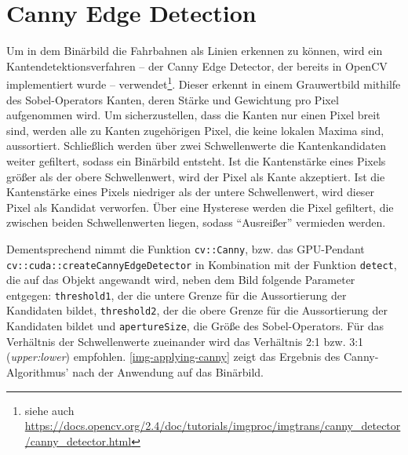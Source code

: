 \documentclass[a4paper,12pt]{report}
\begin{document}
\section{Canny Edge Detection}
	Um in dem Binärbild die Fahrbahnen als Linien erkennen zu können, wird ein Kantendetektionsverfahren -- der Canny Edge Detector, der bereits in OpenCV implementiert wurde -- verwendet\footnote{siehe auch \url{https://docs.opencv.org/2.4/doc/tutorials/imgproc/imgtrans/canny\_detector/canny\_detector.html}}.
	Dieser erkennt in einem Grauwertbild mithilfe des Sobel-Operators Kanten, deren Stärke und Gewichtung pro Pixel aufgenommen wird.
	Um sicherzustellen, dass die Kanten nur einen Pixel breit sind, werden alle zu Kanten zugehörigen Pixel, die keine lokalen Maxima sind, aussortiert.
	Schließlich werden über zwei Schwellenwerte die Kantenkandidaten weiter gefiltert, sodass ein Binärbild entsteht.
	Ist die Kantenstärke eines Pixels größer als der obere Schwellenwert, wird der Pixel als Kante akzeptiert.
	Ist die Kantenstärke eines Pixels niedriger als der untere Schwellenwert, wird dieser Pixel als Kandidat verworfen.
	Über eine Hysterese werden die Pixel gefiltert, die zwischen beiden Schwellenwerten liegen, sodass "`Ausreißer"' vermieden werden.

	Dementsprechend nimmt die Funktion \texttt{cv::Canny}, bzw. das GPU-Pendant \texttt{cv::cuda::createCannyEdgeDetector} in Kombination mit der Funktion \texttt{detect}, die auf das Objekt angewandt wird, neben dem Bild folgende Parameter entgegen: \texttt{threshold1}, der die untere Grenze für die Aussortierung der Kandidaten bildet, \texttt{threshold2}, der die obere Grenze für die Aussortierung der Kandidaten bildet und \texttt{apertureSize}, die Größe des Sobel-Operators.
	Für das Verhältnis der Schwellenwerte zueinander wird das Verhältnis 2:1 bzw. 3:1 (\textit{upper:lower}) empfohlen.
	\autoref{img-applying-canny} zeigt das Ergebnis des Canny-Algorithmus' nach der Anwendung auf das Binärbild.
\end{document}
